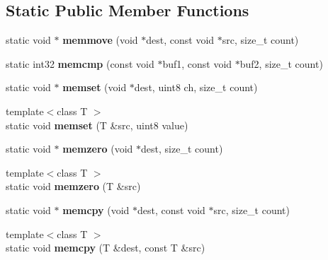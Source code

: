 \subsection*{Static Public Member Functions}
\begin{DoxyCompactItemize}
\item 
\mbox{\label{class_arcana_1_1_memory_aeb97706378a7193a45903247e318e061}} 
static void $\ast$ {\bfseries memmove} (void $\ast$dest, const void $\ast$src, size\+\_\+t count)
\item 
\mbox{\label{class_arcana_1_1_memory_aaa86ed29dadc7b727e9095d61c02df99}} 
static int32 {\bfseries memcmp} (const void $\ast$buf1, const void $\ast$buf2, size\+\_\+t count)
\item 
\mbox{\label{class_arcana_1_1_memory_a55b4b6d7d9ac83f2def9173ace8a1e3f}} 
static void $\ast$ {\bfseries memset} (void $\ast$dest, uint8 ch, size\+\_\+t count)
\item 
\mbox{\label{class_arcana_1_1_memory_a35209e6ffc57590e0edbb99022bad463}} 
{\footnotesize template$<$class T $>$ }\\static void {\bfseries memset} (T \&src, uint8 value)
\item 
\mbox{\label{class_arcana_1_1_memory_ad21b6b9e99dec42df69c4faf409976e8}} 
static void $\ast$ {\bfseries memzero} (void $\ast$dest, size\+\_\+t count)
\item 
\mbox{\label{class_arcana_1_1_memory_a9e1a518ad0cf1375ce1888205e618451}} 
{\footnotesize template$<$class T $>$ }\\static void {\bfseries memzero} (T \&src)
\item 
\mbox{\label{class_arcana_1_1_memory_aa17424bed341eeb0dd05d6d01878a769}} 
static void $\ast$ {\bfseries memcpy} (void $\ast$dest, const void $\ast$src, size\+\_\+t count)
\item 
\mbox{\label{class_arcana_1_1_memory_a44d141c4ace622535407d8bedd430bd4}} 
{\footnotesize template$<$class T $>$ }\\static void {\bfseries memcpy} (T \&dest, const T \&src)

\end{DoxyCompactItemize}
